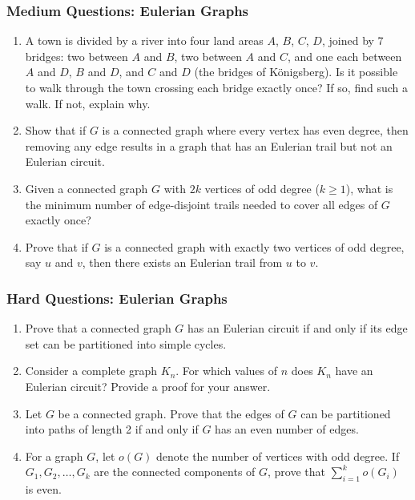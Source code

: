 \documentclass{article}
\theoremstyle{definition}
\begin{document}
\subsubsection{Medium Questions: Eulerian Graphs}
\begin{enumerate}[resume]
    \item A town is divided by a river into four land areas $A$, $B$, $C$, $D$, joined by 7 bridges: two between $A$ and $B$, two between $A$ and $C$, and one each between $A$ and $D$, $B$ and $D$, and $C$ and $D$ (the bridges of K\"onigsberg). Is it possible to walk through the town crossing each bridge exactly once? If so, find such a walk. If not, explain why.
    
    \item Show that if $G$ is a connected graph where every vertex has even degree, then removing any edge results in a graph that has an Eulerian trail but not an Eulerian circuit.
    
    \item Given a connected graph $G$ with $2k$ vertices of odd degree ($k \geq 1$), what is the minimum number of edge-disjoint trails needed to cover all edges of $G$ exactly once?
    
    \item Prove that if $G$ is a connected graph with exactly two vertices of odd degree, say $u$ and $v$, then there exists an Eulerian trail from $u$ to $v$.
\end{enumerate}

\subsubsection{Hard Questions: Eulerian Graphs}
\begin{enumerate}[resume]
    \item Prove that a connected graph $G$ has an Eulerian circuit if and only if its edge set can be partitioned into simple cycles.
    
    \item Consider a complete graph $K_n$. For which values of $n$ does $K_n$ have an Eulerian circuit? Provide a proof for your answer.
    
    \item Let $G$ be a connected graph. Prove that the edges of $G$ can be partitioned into paths of length 2 if and only if $G$ has an even number of edges.
    
    \item For a graph $G$, let $o(G)$ denote the number of vertices with odd degree. If $G_1, G_2, \ldots, G_k$ are the connected components of $G$, prove that $\sum_{i=1}^{k} o(G_i)$ is even.
\end{enumerate}
\end{document}
